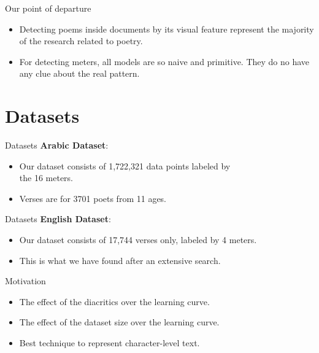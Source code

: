 \documentclass[10pt]{beamer}
\begin{document}
\begin{frame}[fragile]{Our point of departure}
\begin{itemize}
    \item Detecting poems inside documents by its visual feature represent the majority of the research related to poetry.
    \item For detecting meters, all models are so naive and primitive. They do no have any clue about the real pattern.
\end{itemize}

\end{frame}




\section{Datasets}
\begin{frame}[fragile]{Datasets}
\textbf{Arabic Dataset}:
\begin{itemize}
    \item Our dataset consists of  1,722,321 data points labeled by\\ the 16 meters.
    \item Verses are for 3701 poets from 11 ages.
\end{itemize}
\begin{center}

\end{center}
\end{frame}

\begin{frame}[fragile]{Datasets}
\textbf{English Dataset}:
\begin{itemize}
    \item Our dataset consists of 17,744 verses only, labeled by 4 meters.
    \item This is what we have found after an extensive search.
\end{itemize}
\begin{center}

\end{center}
\end{frame}



\begin{frame}[fragile]{Motivation}
\begin{itemize}
    \item The effect of the diacritics over the learning curve.
    \item The effect of the dataset size over the learning curve.
    \item Best technique to represent character-level text. 
\end{itemize}

\end{frame}
\end{document}
